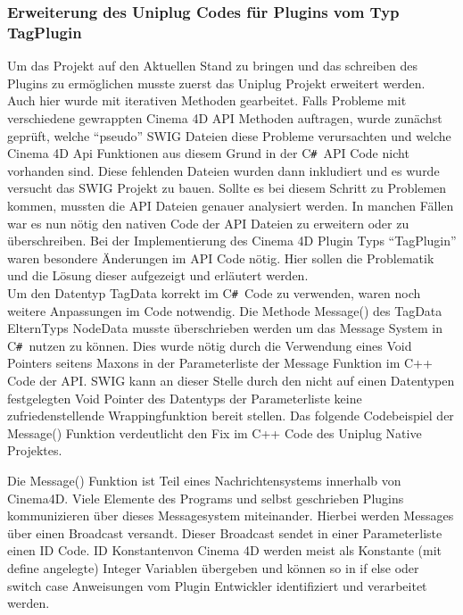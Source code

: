 \documentclass[pagesize, paper=a4, fontsize=12pt, titlepage=true, headings=small, headnosepline, abstractoff, liststotoc, nochapterprefix, plainheadsepline, twoside]{scrreprt}
\newcommand{\CSS}{C\texttt{\# }}
\begin{document}
\subsubsection{Erweiterung des Uniplug Codes für Plugins vom Typ TagPlugin}
Um das Projekt auf den Aktuellen Stand zu bringen und das schreiben des Plugins zu ermöglichen musste zuerst das Uniplug Projekt erweitert werden. Auch hier wurde mit iterativen Methoden gearbeitet. Falls Probleme mit verschiedene gewrappten Cinema 4D API Methoden auftragen, wurde zunächst geprüft, welche “pseudo” SWIG Dateien diese Probleme verursachten und welche Cinema 4D Api Funktionen aus diesem Grund in der \CSS API Code nicht vorhanden sind. Diese fehlenden Dateien wurden dann inkludiert und es wurde versucht das SWIG Projekt zu bauen. Sollte es bei diesem Schritt zu Problemen kommen, mussten die API Dateien genauer analysiert werden. In manchen Fällen war es nun nötig den nativen Code der API Dateien zu erweitern oder zu überschreiben. Bei der Implementierung des Cinema 4D Plugin Typs “TagPlugin” waren besondere Änderungen im API Code nötig. Hier sollen die Problematik und die Lösung dieser aufgezeigt und erläutert werden.
\\


Um den Datentyp TagData korrekt im \CSS Code zu verwenden, waren noch weitere Anpassungen im Code notwendig. Die Methode Message() des TagData ElternTyps NodeData musste überschrieben werden um das Message System in \CSS nutzen zu können. Dies wurde nötig durch die Verwendung eines Void Pointers seitens Maxons in der Parameterliste der Message Funktion im C++ Code der API. SWIG kann an dieser Stelle durch den nicht auf einen Datentypen festgelegten Void Pointer des Datentyps der Parameterliste keine zufriedenstellende Wrappingfunktion bereit stellen. Das folgende Codebeispiel der Message() Funktion verdeutlicht den Fix im C++ Code des Uniplug Native Projektes.

Die Message() Funktion ist Teil eines Nachrichtensystems innerhalb von Cinema4D. Viele Elemente des Programs und selbst geschrieben Plugins kommunizieren über dieses Messagesystem miteinander. Hierbei werden Messages über einen Broadcast versandt. Dieser Broadcast sendet in einer Parameterliste einen ID Code. ID Konstantenvon Cinema 4D werden meist als Konstante (mit define angelegte) Integer Variablen übergeben und können so in if else oder switch case Anweisungen vom Plugin Entwickler identifiziert und verarbeitet werden.
\end{document}
